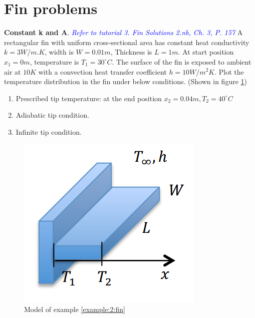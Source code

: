 \section{Fin problems}
\begin{example}
\label{example:2:fin}
\textbf{Constant k and A}. 
\textcolor{blue} {\emph{Refer to tutorial 3.  Fin Solutions 2.nb, Ch. 3, P. 157}}
A rectangular fin with uniform cross-sectional area has constant heat conductivity
$k=3W/m.K$, width is $W=0.01m$, Thickness is $L=1m$. At start position $x_1=0m$, temperature is $T_1=30^\circ C$. The surface of the fin is exposed to ambient air at $10K$ with a convection heat transfer coefficient $h=10W/m^2K$.
Plot the temperature distribution in the fin under below conditions. (Shown in figure \ref{fig:2:12})
\begin{enumerate}
\item Prescribed tip temperature: at the end position $x_2=0.04m, T_2=40^\circ C$
\item Adiabatic tip condition.
\item Infinite tip condition.
\end{enumerate}
\begin{figure}[H]
  \centering
    \includegraphics[scale=0.7]{figures/ch2/12}
    \caption{Model of example \ref{example:2:fin}}
    \label{fig:2:12}
\end{figure}
\end{example}

